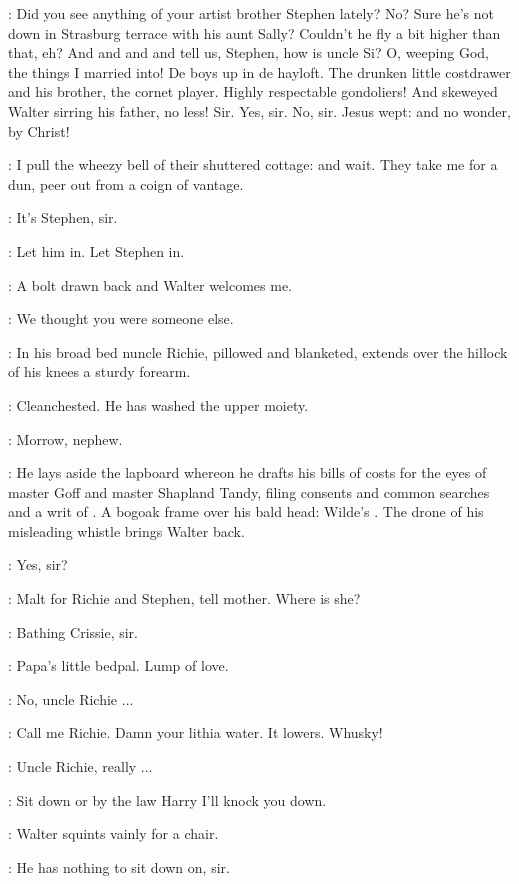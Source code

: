\simon:
Did you see anything of your artist brother Stephen lately?
No?
Sure he's not down in Strasburg terrace with his aunt Sally?
Couldn't he fly a bit higher than that, eh?
And and and and tell us, Stephen,
how is uncle Si?
O, weeping God, the things I married into!
De boys up in de hayloft.
The drunken little costdrawer
and his brother, the cornet player.
Highly respectable gondoliers!
And skeweyed Walter sirring his father, no less!
Sir.
Yes, sir.
No, sir.
Jesus wept:
and no wonder, by Christ!

\StephenInt:
I pull the wheezy bell of their shuttered cottage:
and wait.
They take me for a dun,
peer out from a coign of vantage.

\walter:
It's Stephen, sir.

\richie:
Let him in.
Let Stephen in.

\StephenInt:
A bolt drawn back and Walter welcomes me.

\walter:
We thought you were someone else.

:
In his broad bed
nuncle Richie, pillowed and blanketed,
extends over the hillock of his knees a sturdy forearm.

\StephenInt:
Cleanchested.
He has washed the upper moiety.

\richie:
Morrow, nephew.

:
He lays aside the lapboard whereon he drafts his bills of costs
for the eyes of master Goff and master Shapland Tandy,
filing consents and common searches and a writ of .
A bogoak frame over his bald head:
Wilde's .
The drone of his misleading whistle brings Walter back.

\walter:
Yes, sir?

\richie:
Malt for Richie and Stephen, tell mother.
Where is she?

\walter:
Bathing Crissie, sir.

\StephenInt:
Papa's little bedpal.
Lump of love.

\Stephen:
No, uncle Richie ...

\richie:
Call me Richie.
Damn your lithia water.
It lowers.
Whusky!

\Stephen:
Uncle Richie, really ...

\richie:
Sit down or by the law Harry
I'll knock you down.

:
Walter squints vainly for a chair.

\walter:
He has nothing to sit down on, sir.


